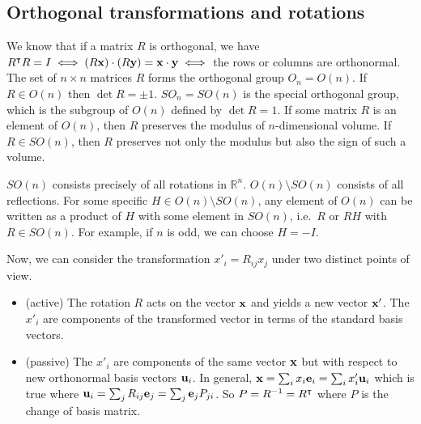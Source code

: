 \subsection{Orthogonal transformations and rotations}
We know that if a matrix \(R\) is orthogonal, we have \(R^\intercal R = I \iff (R\vb x) \cdot (R\vb y) = \vb x \cdot \vb y \iff\) the rows or columns are orthonormal.
The set of \(n \times n\) matrices \(R\) forms the orthogonal group \(O_n = O(n)\).
If \(R \in O(n)\) then \(\det R = \pm 1\).
\(SO_n = SO(n)\) is the special orthogonal group, which is the subgroup of \(O(n)\) defined by \(\det R = 1\).
If some matrix \(R\) is an element of \(O(n)\), then \(R\) preserves the modulus of \(n\)-dimensional volume.
If \(R \in SO(n)\), then \(R\) preserves not only the modulus but also the sign of such a volume.

\(SO(n)\) consists precisely of all rotations in \(\mathbb R^n\).
\(O(n) \setminus SO(n)\) consists of all reflections.
For some specific \(H \in O(n) \setminus SO(n)\), any element of \(O(n)\) can be written as a product of \(H\) with some element in \(SO(n)\), i.e.\ \(R\) or \(RH\) with \(R \in SO(n)\).
For example, if \(n\) is odd, we can choose \(H = -I\).

Now, we can consider the transformation \(x'_i = R_{ij} x_j\) under two distinct points of view.
\begin{itemize}
	\item (active) The rotation \(R\) acts on the vector \(\vb x\) and yields a new vector \(\vb x'\).
	      The \(x'_i\) are components of the transformed vector in terms of the standard basis vectors.
	\item (passive) The \(x'_i\) are components of the same vector \(\vb x\) but with respect to new orthonormal basis vectors \(\vb u_i\).
	      In general, \(\vb x = \sum_i x_i \vb e_i = \sum_i x'_i \vb u_i\) which is true where \(\vb u_i = \sum_j R_{ij} \vb e_j = \sum_j \vb e_j P_{ji}\).
	      So \(P = R^{-1} = R^\intercal\) where \(P\) is the change of basis matrix.
\end{itemize}

